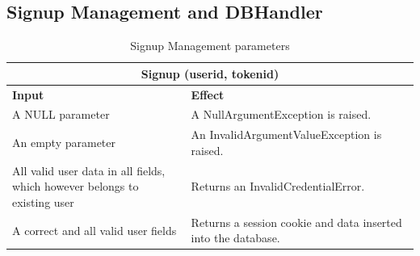 \documentclass[a4paper, hidelinks, 12pt]{report}
\begin{document}
	\subsection{Signup Management and DBHandler}
	\begin{table}[H]
		\centering
		\begin{tabular}{|p{6cm}|p{9cm}|}
			\hline\hline
			\multicolumn{2}{c}{\textbf{Signup (userid, tokenid)} }\\
			\hline
			\textbf{Input} & \textbf{Effect} \\ [0.5ex]
			\hline
			A NULL parameter & A NullArgumentException is raised.  \\
			\hline
			An empty parameter & An InvalidArgumentValueException is raised.\\
			\hline
			All valid user data in all fields, which however belongs to existing user & Returns an InvalidCredentialError.\\
\hline
			A correct and all valid user fields & Returns a session cookie and data inserted into the database.\\
			\hline
			
		\end{tabular}
		\caption{Signup Management parameters}
		\label{fig:Signup Management parameters}
	\end{table}
\end{document}
